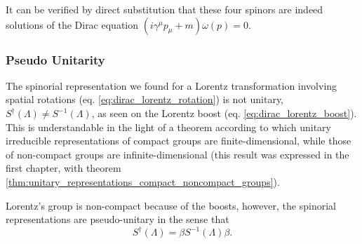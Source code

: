 It can be verified by direct substitution that these four spinors are indeed solutions of the Dirac equation \((i \gamma^{\mu} p_{\mu} + m) \omega(p) = 0\).

\subsubsection{Pseudo Unitarity}

The spinorial representation we found for a Lorentz transformation involving spatial rotations (eq. \eqref{eq:dirac_lorentz_rotation}) is not unitary, \(S^{\dagger}(\Lambda) \neq S^{-1}(\Lambda)\), as seen on the Lorentz boost (eq. \eqref{eq:dirac_lorentz_boost}). This is understandable in the light of a theorem according to which unitary irreducible representations of compact groups are finite-dimensional, while those of non-compact groups are infinite-dimensional (this result was expressed in the first chapter, with theorem \ref{thm:unitary_representations_compact_noncompact_groups}).

Lorentz’s group is non-compact because of the boosts, however, the spinorial representations are pseudo-unitary in the sense that
\begin{equation}
    S^{\dagger}(\Lambda) = \beta S^{-1}(\Lambda)\beta.
    \label{eq:pseudo_unitarity}
\end{equation}

